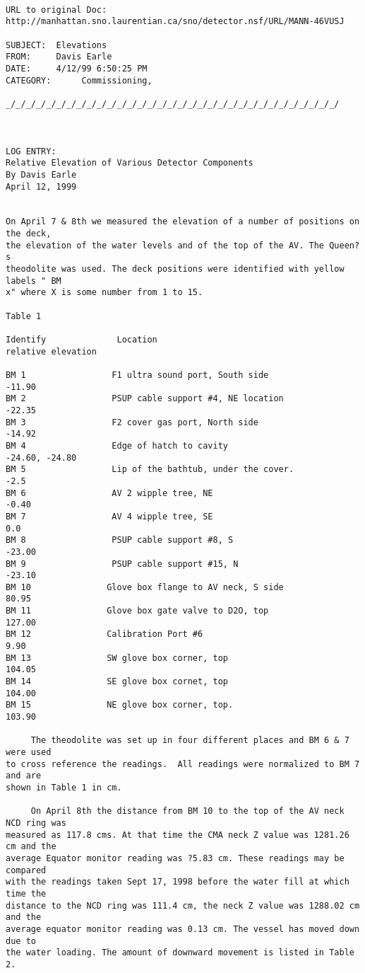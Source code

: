 \begin{verbatim} 

URL to original Doc:
http://manhattan.sno.laurentian.ca/sno/detector.nsf/URL/MANN-46VUSJ

SUBJECT:  Elevations
FROM:     Davis Earle
DATE:     4/12/99 6:50:25 PM
CATEGORY:      Commissioning,

_/_/_/_/_/_/_/_/_/_/_/_/_/_/_/_/_/_/_/_/_/_/_/_/_/_/_/_/_/_/_/_/_/



LOG ENTRY:
Relative Elevation of Various Detector Components
By Davis Earle
April 12, 1999


On April 7 & 8th we measured the elevation of a number of positions on the deck,
the elevation of the water levels and of the top of the AV. The Queen?s
theodolite was used. The deck positions were identified with yellow labels " BM
x" where X is some number from 1 to 15.

Table 1

Identify              Location
relative elevation

BM 1                 F1 ultra sound port, South side                   -11.90
BM 2                 PSUP cable support #4, NE location            -22.35
BM 3                 F2 cover gas port, North side                     -14.92
BM 4                 Edge of hatch to cavity
-24.60, -24.80
BM 5                 Lip of the bathtub, under the cover.              -2.5
BM 6                 AV 2 wipple tree, NE                               -0.40
BM 7                 AV 4 wipple tree, SE                                0.0
BM 8                 PSUP cable support #8, S                          -23.00
BM 9                 PSUP cable support #15, N                        -23.10
BM 10               Glove box flange to AV neck, S side            80.95
BM 11               Glove box gate valve to D2O, top               127.00
BM 12               Calibration Port #6                                    9.90
BM 13               SW glove box corner, top                           104.05
BM 14               SE glove box cornet, top                           104.00
BM 15               NE glove box corner, top.                          103.90

     The theodolite was set up in four different places and BM 6 & 7 were used
to cross reference the readings.  All readings were normalized to BM 7 and are
shown in Table 1 in cm.

     On April 8th the distance from BM 10 to the top of the AV neck NCD ring was
measured as 117.8 cms. At that time the CMA neck Z value was 1281.26 cm and the
average Equator monitor reading was ?5.83 cm. These readings may be compared
with the readings taken Sept 17, 1998 before the water fill at which time the
distance to the NCD ring was 111.4 cm, the neck Z value was 1288.02 cm and the
average equator monitor reading was 0.13 cm. The vessel has moved down due to
the water loading. The amount of downward movement is listed in Table 2.


\end{verbatim}
